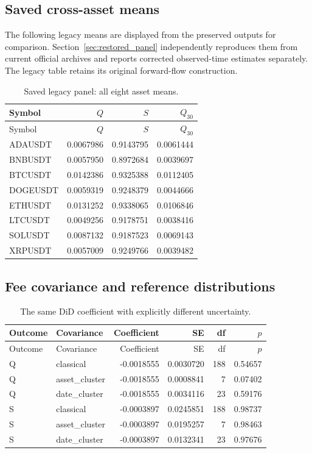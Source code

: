 \subsection{Saved cross-asset means}
The following legacy means are displayed from the preserved outputs for comparison. Section~\ref{sec:restored_panel} independently reproduces them from current official archives and reports corrected observed-time estimates separately. The legacy table retains its original forward-flow construction.
\begin{longtable}{lrrr}
\caption{Saved legacy panel: all eight asset means.}\\
\toprule Symbol & $Q$ & $S$ & $Q_{30}$\\\midrule\endfirsthead
\toprule Symbol & $Q$ & $S$ & $Q_{30}$\\\midrule\endhead
\bottomrule\endfoot
ADAUSDT & 0.0067986 & 0.9143795 & 0.0061444\\
BNBUSDT & 0.0057950 & 0.8972684 & 0.0039697\\
BTCUSDT & 0.0142386 & 0.9325388 & 0.0112405\\
DOGEUSDT & 0.0059319 & 0.9248379 & 0.0044666\\
ETHUSDT & 0.0131252 & 0.9338065 & 0.0106846\\
LTCUSDT & 0.0049256 & 0.9178751 & 0.0038416\\
SOLUSDT & 0.0087132 & 0.9187523 & 0.0069143\\
XRPUSDT & 0.0057009 & 0.9249766 & 0.0039482\\
\end{longtable}
\subsection{Fee covariance and reference distributions}
\begin{longtable}{llrrrr}
\caption{The same DiD coefficient with explicitly different uncertainty.}\\
\toprule Outcome & Covariance & Coefficient & SE & df & $p$\\\midrule\endfirsthead
\toprule Outcome & Covariance & Coefficient & SE & df & $p$\\\midrule\endhead
\bottomrule\endfoot
Q & classical & -0.0018555 & 0.0030720 & 188 & 0.54657\\
Q & asset\_cluster & -0.0018555 & 0.0008841 & 7 & 0.07402\\
Q & date\_cluster & -0.0018555 & 0.0034116 & 23 & 0.59176\\
S & classical & -0.0003897 & 0.0245851 & 188 & 0.98737\\
S & asset\_cluster & -0.0003897 & 0.0195257 & 7 & 0.98463\\
S & date\_cluster & -0.0003897 & 0.0132341 & 23 & 0.97676\\
\end{longtable}
